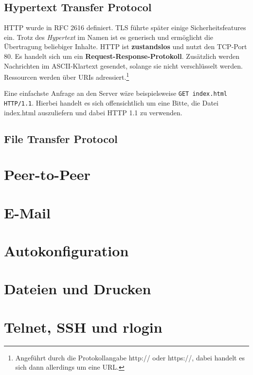\documentclass{article} %
\begin{document}
\subsection{Hypertext Transfer Protocol}

HTTP wurde in RFC 2616\cite{rfc2616} definiert.
TLS\cite{rfc2817} führte später einige Sicherheitsfeatures ein.
Trotz des \emph{Hypertext} im Namen ist es generisch und ermöglicht die Übertragung beliebiger Inhalte.
HTTP ist \textbf{zustandslos} und nutzt den TCP-Port 80.
Es handelt sich um ein \textbf{Request-Response-Protokoll}.
Zusätzlich werden Nachrichten im ASCII-Klartext gesendet, solange sie nicht verschlüsselt werden.
Ressourcen werden über URIs\cite{rfc2396} adressiert.\footnote{Angeführt durch die Protokollangabe http:// oder https://, dabei handelt es sich dann allerdings um eine URL.}

Eine einfachste Anfrage an den Server wäre beispielsweise \texttt{GET index.html HTTP/1.1}.
Hierbei handelt es sich offensichtlich um eine Bitte, die Datei index.html auszuliefern und dabei HTTP 1.1 zu verwenden.

\subsection{File Transfer Protocol}

\section{Peer-to-Peer}


\section{E-Mail}


\section{Autokonfiguration}


\section{Dateien und Drucken}


\section{Telnet, SSH und rlogin}
\end{document}
